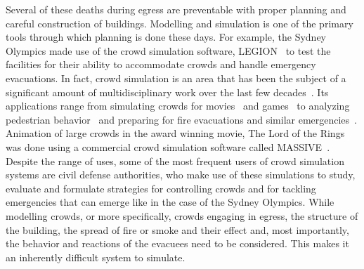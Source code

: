 Several of these deaths during egress are preventable with proper planning and careful construction of buildings. Modelling and simulation is one of the primary tools through which planning is done these days. For example, the Sydney Olympics made use of the crowd simulation software, LEGION~\cite{Still:2000tp} to test the facilities for their ability to accommodate crowds and handle emergency evacuations. In fact, crowd simulation is an area that has been the subject of a significant amount of multidisciplinary work over the last few decades~\cite{Still:2000tp,Zhou:2010:CMS:1842722.1842725,Gwynne:1999vi}. Its applications range from simulating crowds for movies~\cite{Regelous:2011vt,Reynolds:1987vm} and games~\cite{Snape:2012,ageOfEmpires:2013} to analyzing pedestrian behavior~\cite{Helbing:1995ie,Viswanathan:ut,Guy:2010uv} and preparing for fire evacuations and similar emergencies~\cite{Klupfel:2005to,PEDFull:2011,Mordvintsev:2012}. Animation of large crowds in the award winning movie, The Lord of the Rings was done using a commercial crowd simulation software called MASSIVE~\cite{Regelous:2011vt}. Despite the range of uses, some of the most frequent users of crowd simulation systems are civil defense authorities, who make use of these simulations to study, evaluate and formulate strategies for controlling crowds and for tackling emergencies that can emerge like in the case of the Sydney Olympics. While modelling crowds, or more specifically, crowds engaging in egress, the structure of the building, the spread of fire or smoke and their effect and, most importantly, the behavior and reactions of the evacuees need to be considered. This makes it an inherently difficult system to simulate.





